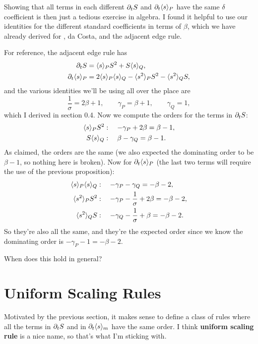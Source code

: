 \documentclass[twoside,10pt]{article}
\begin{document}
Showing that all terms in each different $\partial_{t}{S} $ and $\partial_{t}{\langle s \rangle_{P}} $ have the same $\delta$ coefficient is then just a tedious exercise in algebra. I found it helpful to use our identities for the different standard coefficients in terms of $\beta$, which we have already derived for \ER, da Costa, and the adjacent edge rule.

\begin{ex}
For reference, the adjacent edge rule has
\begin{align*}
	\partial_{t}{S} &= \langle s \rangle_{P}S^2 + S\langle s \rangle_{Q}, \\
	\partial_{t}{\langle s \rangle_{P}} &= 2\langle s \rangle_{P}\langle s \rangle_{Q} - \langle s^2 \rangle_{P}S^2 - \langle s^2 \rangle_{Q}S,
\end{align*}
and the various identities we'll be using all over the place are
\[
\frac{1}{\sigma} = 2\beta+1, \quad\quad \gamma_{P} = \beta+1, \quad\quad \gamma_{Q}=1,
\] which I derived in section 0.4. Now we compute the orders for the terms in $\partial_{t}{S} $:
\begin{align*}
	\langle s \rangle_{P}S^2 &:\quad -\gamma_{P}+2\beta = \beta-1, \\
	S\langle s \rangle_{Q} &:\quad \beta-\gamma_{Q} = \beta-1.
\end{align*}
As claimed, the orders are the same (we also expected the dominating order to be $\beta-1$, so nothing here is broken). Now for $\partial_{t}{\langle s \rangle_{P}} $ (the last two terms will require the use of the previous proposition):
\begin{align*}
	\langle s \rangle_{P}\langle s \rangle_{Q} &:\quad -\gamma_{P}-\gamma_{Q} = -\beta-2, \\
	\langle s^2 \rangle_{P}S^2 &:\quad -\gamma_{P} - \frac{1}{\sigma} + 2\beta = -\beta-2, \\
	\langle s^2 \rangle_{Q}S &:\quad -\gamma_{Q} - \frac{1}{\sigma} + \beta = -\beta-2.
\end{align*}
So they're also all the same, and they're the expected order since we know the dominating order is $-\gamma_{P}-1 = -\beta-2$.
\end{ex}
{\color{blue}When does this hold in general?}


\section{Uniform Scaling Rules}

Motivated by the previous section, it makes sense to define a class of rules where all the terms in $\partial_{t}{S} $ and in $\partial_{t}{\langle s \rangle_{m}} $ have the same order. I think \textbf{uniform scaling rule} is a nice name, so that's what I'm sticking with.
\end{document}
